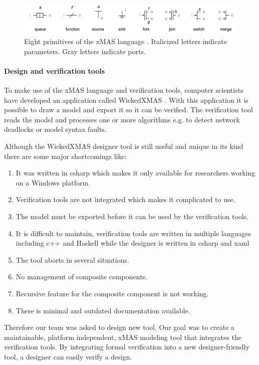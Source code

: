 \begin{figure}[here]
\includegraphics[width=1.0\textwidth]{xmas-language}
\caption{Eight primitives of the xMAS language \cite{6225465}. Italicized letters indicate
parameters. Gray letters indicate ports.}
\label{fig:xmas-language}
\end{figure}

\paragraph{Design and verification tools}

To make use of the xMAS language and verification tools, computer scientists
have developed an application called WickedXMAS \cite{WickedXmas}.
With this application it is possible to draw a model and export it so it can be
verified. The verification tool reads the model and processes one or more
algorithms e.g. to detect network deadlocks or model syntax faults.

Although the WickedXMAS designer tool is still useful and unique in its kind
there are some major shortcomings like:
\begin{enumerate}
\item It was written in csharp which makes it only available for researchers
working on a Windows platform.
\item Verification tools are not integrated which
makes it complicated to use.
\item The model must be exported before it can be
used by the verification tools.
\item It is difficult to maintain, verification tools are written in multiple languages
including c++ and Haskell while the designer is written in csharp and xaml
\item The tool aborts in several situations.
\item No management of composite components.
\item Recursive feature for the composite component is not working.
\item There is minimal and outdated documentation available.
\end{enumerate}

Therefore our team was asked to design new tool. Our goal was to
create a maintainable, platform independent, xMAS modeling tool that integrates
the verification tools.
By integrating formal verification into a new designer-friendly tool, a designer
can easily verify a design.

